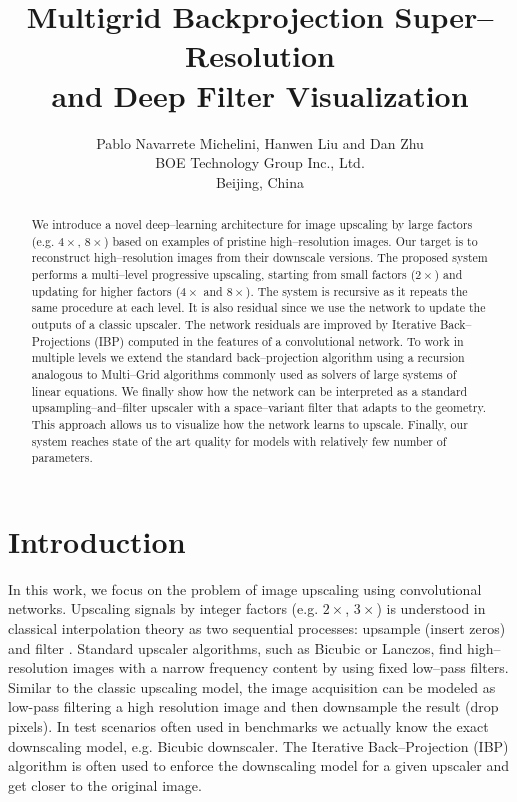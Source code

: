 \documentclass[letterpaper]{article}
\begin{document}
\title{Multigrid Backprojection Super--Resolution\\ and Deep Filter Visualization}
\author{Pablo Navarrete Michelini, Hanwen Liu and Dan Zhu\\
BOE Technology Group Inc., Ltd.\\
Beijing, China
}
\nocopyright
\maketitle
\begin{abstract}
We introduce a novel deep--learning architecture for image upscaling by large factors (e.g. $4\times$, $8\times$) based on examples of pristine high--resolution images. Our target is to reconstruct high--resolution images from their downscale versions. The proposed system performs a multi--level progressive upscaling, starting from small factors ($2\times$) and updating for higher factors ($4\times$ and $8\times$). The system is recursive as it repeats the same procedure at each level. It is also residual since we use the network to update the outputs of a classic upscaler. The network residuals are improved by Iterative Back--Projections (IBP) computed in the features of a convolutional network. To work in multiple levels we extend the standard back--projection algorithm using a recursion analogous to Multi--Grid algorithms commonly used as solvers of large systems of linear equations. We finally show how the network can be interpreted as a standard upsampling--and--filter upscaler with a space--variant filter that adapts to the geometry. This approach allows us to visualize how the network learns to upscale. Finally, our system reaches state of the art quality for models with relatively few number of parameters.
\end{abstract}

\section{Introduction}
\label{intro}
In this work, we focus on the problem of image upscaling using convolutional networks. Upscaling signals by integer factors (e.g. $2\times$, $3\times$) is understood in classical interpolation theory as two sequential processes: upsample (insert zeros) and filter \cite{JGProakis_2007a,SMallat_1998a}. Standard upscaler algorithms, such as Bicubic or Lanczos, find high--resolution images with a narrow frequency content by using fixed low--pass filters. Similar to the classic upscaling model, the image acquisition can be modeled as low-pass filtering a high resolution image and then downsample the result (drop pixels). In test scenarios often used in benchmarks we actually know the exact downscaling model, e.g. Bicubic downscaler. The Iterative Back--Projection (IBP) algorithm \cite{Irani_1991a} is often used to enforce the downscaling model for a given upscaler and get closer to the original image.
\end{document}
